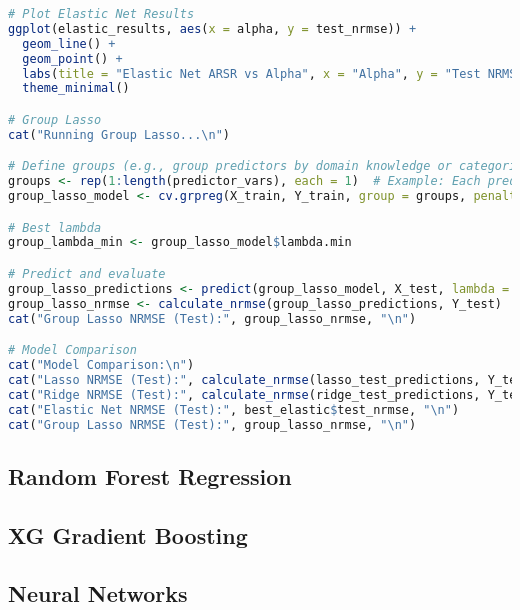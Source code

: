 \begin{lstlisting}[language=R, breaklines=true, basicstyle=\ttfamily\small, columns=fullflexible]
# Plot Elastic Net Results
ggplot(elastic_results, aes(x = alpha, y = test_nrmse)) +
  geom_line() +
  geom_point() +
  labs(title = "Elastic Net ARSR vs Alpha", x = "Alpha", y = "Test NRMSE") +
  theme_minimal()

# Group Lasso
cat("Running Group Lasso...\n")

# Define groups (e.g., group predictors by domain knowledge or categories)
groups <- rep(1:length(predictor_vars), each = 1)  # Example: Each predictor is its own group
group_lasso_model <- cv.grpreg(X_train, Y_train, group = groups, penalty = "grLasso")

# Best lambda
group_lambda_min <- group_lasso_model$lambda.min

# Predict and evaluate
group_lasso_predictions <- predict(group_lasso_model, X_test, lambda = group_lambda_min)
group_lasso_nrmse <- calculate_nrmse(group_lasso_predictions, Y_test)
cat("Group Lasso NRMSE (Test):", group_lasso_nrmse, "\n")

# Model Comparison
cat("Model Comparison:\n")
cat("Lasso NRMSE (Test):", calculate_nrmse(lasso_test_predictions, Y_test), "\n")
cat("Ridge NRMSE (Test):", calculate_nrmse(ridge_test_predictions, Y_test), "\n")
cat("Elastic Net NRMSE (Test):", best_elastic$test_nrmse, "\n")
cat("Group Lasso NRMSE (Test):", group_lasso_nrmse, "\n")

\end{lstlisting}

\subsection{Random Forest Regression}
\subsection{XG Gradient Boosting}
\subsection{Neural Networks}

